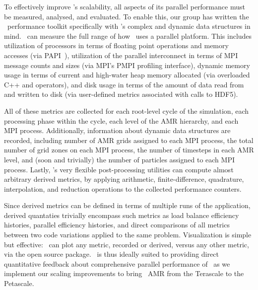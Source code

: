 \documentclass{article}
\begin{document}

 To effectively improve \enzo's scalability, all aspects of its
 parallel performance must be measured, analysed, and evaluated.  To
 enable this, our group has written the \lcaperf\ performance toolkit
 specifically with \enzo's complex and dynamic data structures in
 mind.  \lcaperf\ can measure the full range of how \enzo\ uses a
 parallel platform.  This includes utilization of processors in terms
 of floating point operations and memory accesses (via
 PAPI~\cite{BrDo00}), utilization of the parallel interconnect in
 terms of MPI message counts and sizes (via MPI's PMPI profiling
 interface), dynamic memory usage in terms of current and high-water
 heap memory allocated (via overloaded C++  and
  operators), and disk usage in terms of the amount of
 data read from and written to disk (via user-defined metrics
 associated with calls to HDF5).  

 All of these metrics are collected for each root-level cycle of the
 simulation, each processing phase within the cycle, each level of the
 AMR hierarchy, and each MPI process.  Additionally, information about
 dynamic data structures are recorded, including number of AMR grids
 assigned to each MPI process, the total number of grid zones on each
 MPI process, the number of timesteps in each AMR level, and (soon and
 trivially) the number of particles assigned to each MPI process.
 Lastly, \lcaperf's very flexible post-processing utilities can
 compute almost arbitrary derived metrics, by applying arithmetic,
 finite-difference, quadrature, interpolation, and reduction
 operations to the collected performance counters.  

 Since derived metrics can be defined in terms of multiple runs of the
 application, derived quantaties trivially encompass such metrics as
 load balance efficiency histories, parallel efficiency histories, and
 direct comparisons of all metrics between two code variations applied
 to the same problem.  Visualization is simple but effective:
 \lcaperf\ can plot any metric, recorded or derived, versus any other
 metric, via the open source  package.  \lcaperf\ is
 thus ideally suited to providing direct quantitative feedback about
 comprehensive parallel performance of \enzo\ as we implement our
 scaling improvements to bring \enzo\ AMR from the Terascale to the
 Petascale.
\end{document}
